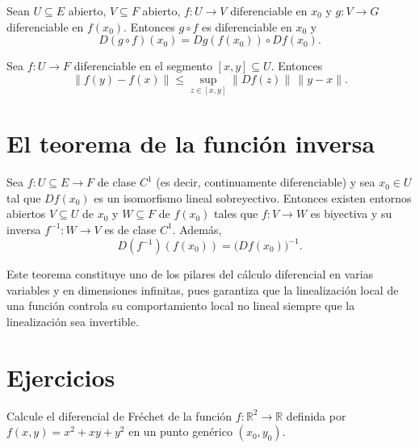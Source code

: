 \begin{proposition}\label{prop:cadena}
Sean $U\subseteq E$ abierto, $V\subseteq F$ abierto, $f\colon U\to V$
diferenciable en $x_0$ y $g\colon V\to G$ diferenciable en $f(x_0)$. Entonces
$g\circ f$ es diferenciable en $x_0$ y
\begin{equation}\label{eq:cadena}
  D(g\circ f)(x_0)=Dg(f(x_0))\circ Df(x_0).
\end{equation}
\end{proposition}

\begin{theorem}\label{teo:valor-medio}
Sea $f\colon U\to F$ diferenciable en el segmento $[x,y]\subseteq U$. Entonces
\begin{equation}\label{eq:valor-medio}
  \|f(y)-f(x)\|\leq\sup_{z\in[x,y]}\|Df(z)\|\,\|y-x\|.
\end{equation}
\end{theorem}

\section{El teorema de la función inversa}

\begin{theorem}\label{teo:inversa}
Sea $f\colon U\subseteq E\to F$ de clase $C^1$ (es decir, continuamente
diferenciable) y sea $x_0\in U$ tal que $Df(x_0)$ es un isomorfismo lineal
sobreyectivo. Entonces existen entornos abiertos $V\subseteq U$ de $x_0$ y
$W\subseteq F$ de $f(x_0)$ tales que $f\colon V\to W$ es biyectiva y su
inversa $f^{-1}\colon W\to V$ es de clase $C^1$. Además,
\begin{equation}\label{eq:inversa}
  D(f^{-1})(f(x_0))=\bigl(Df(x_0)\bigr)^{-1}.
\end{equation}
\end{theorem}

Este teorema constituye uno de los pilares del cálculo diferencial en varias
variables y en dimensiones infinitas, pues garantiza que la linealización local
de una función controla su comportamiento local no lineal siempre que la
linealización sea invertible.

\section{Ejercicios}

\begin{exercise}
Calcule el diferencial de Fréchet de la función $f\colon\mathbb{R}^2\to\mathbb{R}$
definida por $f(x,y)=x^2+xy+y^2$ en un punto genérico $(x_0,y_0)$.
\end{exercise}


